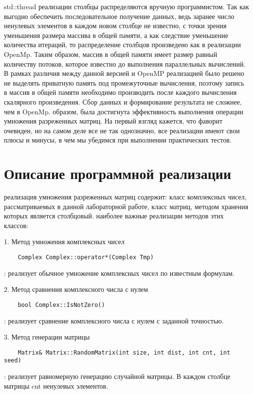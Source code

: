 \documentclass[12pt]{report}
\begin{document}
 std::thread реализации столбцы распределяются вручную программистом. Так как выгодно обеспечить последовательное получение данных, ведь заранее число ненулевых элементов в каждом новом столбце не известно, с точки зрения уменьшения размера массива в общей памяти, а как следствие уменьшение количества итераций, то распределение столбцов произведено как в реализации OpenMp. Таким образом, массив в общей памяти имеет размер равный количеству потоков, которое известно до выполнения параллельных вычислений. В рамках различия между данной версией и OpenMP реализацией было решено не выделять приватную память под промежуточные вычисления, поэтому запись в массив в общей памяти необходимо производить после каждого вычисления скалярного произведения. Сбор данных и формирование результата не сложнее, чем в OpenMp.
 образом, была достигнута эффективность выполнения операции умножения разреженных матриц. На первый взгляд кажется, что фаворит очевиден, но на самом деле все не так однозначно, все реализации имеют свои плюсы и минусы, в чем мы убедимся при выполнении практических тестов.

\newpage

\section*{Описание программной реализации}
 реализация умножения разреженных матриц содержит: класс комплексных чисел, рассматриваемых в данной лабораторной работе, класс матриц, методом хранения которых является столбцовый.
 наиболее важные реализации методов этих классов:
\par 1. Метод умножения комплексных чисел
\begin{lstlisting}
    Complex Complex::operator*(Complex Tmp)
\end{lstlisting}
: реализует обычное умножение комплексных чисел по известным формулам.

\par 2. Метод сравнения комплексного числа с нулем
\begin{lstlisting}
    bool Complex::IsNotZero()
\end{lstlisting}
: реализует сравнение комплексного числа с нулем с заданной точностью.

\par 3. Метод генерации матрицы
\begin{lstlisting}
    Matrix& Matrix::RandomMatrix(int size, int dist, int cnt, int seed)
\end{lstlisting}
: реализует равномерную генерацию случайной матрицы. В каждом столбце матрицы cnt ненулевых элементов.
\end{document}
